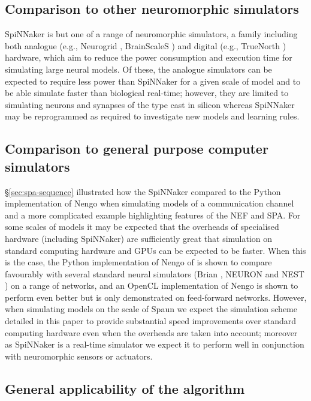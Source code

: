 \documentclass[conference]{IEEEtran}
\begin{document}
  \subsection{Comparison to other neuromorphic simulators}

  SpiNNaker is but one of a range of neuromorphic simulators, a family including both analogue (e.g., Neurogrid \parencite{Benjamin2014}, BrainScaleS \parencite{Schemmel2010}) and digital (e.g., TrueNorth \parencite{Merolla2014}) hardware, which aim to reduce the power consumption and execution time for simulating large neural models.
  Of these, the analogue simulators can be expected to require less power than SpiNNaker for a given scale of model \parencite{Stromatias2013} and to be able simulate faster than biological real-time; however, they are limited to simulating neurons and synapses of the type cast in silicon whereas SpiNNaker may be reprogrammed as required to investigate new models and learning rules.

  \subsection{Comparison to general purpose computer simulators}

  \S\ref{sec:spa-sequence} illustrated how the SpiNNaker compared to the Python implementation of Nengo when simulating models of a communication channel and a more complicated example highlighting features of the NEF and SPA.
  For some scales of models it may be expected that the overheads of specialised hardware (including SpiNNaker) are sufficiently great that simulation on standard computing hardware and GPUs can be expected to be faster.
  When this is the case, the Python implementation of Nengo of \textcite[\S6]{Bekolay2014} is shown to compare favourably with several standard neural simulators (Brian \parencite{Goodman2009}, NEURON \parencite{Hines2009} and NEST \parencite{Eppler2009}) on a range of networks, and an OpenCL implementation of Nengo is shown to perform even better but is only demonstrated on feed-forward networks.
  However, when simulating models on the scale of Spaun we expect the simulation scheme detailed in this paper to provide substantial speed improvements over standard computing hardware even when the overheads are taken into account; moreover as SpiNNaker is a real-time simulator we expect it to perform well in conjunction with neuromorphic sensors or actuators.

  \subsection{General applicability of the algorithm}
\end{document}
